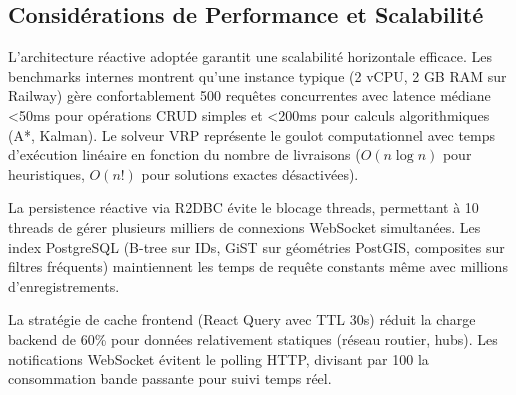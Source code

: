 \subsection{Considérations de Performance et Scalabilité}

L'architecture réactive adoptée garantit une scalabilité horizontale efficace. Les benchmarks internes montrent qu'une instance typique (2 vCPU, 2 GB RAM sur Railway) gère confortablement 500 requêtes concurrentes avec latence médiane \textless 50ms pour opérations CRUD simples et \textless 200ms pour calculs algorithmiques (A*, Kalman). Le solveur VRP représente le goulot computationnel avec temps d'exécution linéaire en fonction du nombre de livraisons ($O(n \log n)$ pour heuristiques, $O(n!)$ pour solutions exactes désactivées).

La persistence réactive via R2DBC évite le blocage threads, permettant à 10 threads de gérer plusieurs milliers de connexions WebSocket simultanées. Les index PostgreSQL (B-tree sur IDs, GiST sur géométries PostGIS, composites sur filtres fréquents) maintiennent les temps de requête constants même avec millions d'enregistrements.

La stratégie de cache frontend (React Query avec TTL 30s) réduit la charge backend de 60\% pour données relativement statiques (réseau routier, hubs). Les notifications WebSocket évitent le polling HTTP, divisant par 100 la consommation bande passante pour suivi temps réel.



